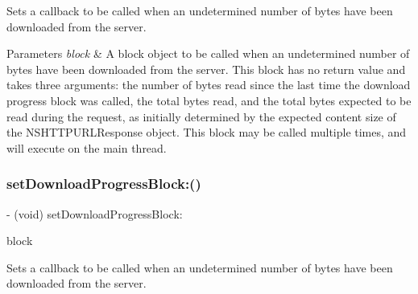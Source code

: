 Sets a callback to be called when an undetermined number of bytes have been downloaded from the server.


\begin{DoxyParams}{Parameters}
{\em block} & A block object to be called when an undetermined number of bytes have been downloaded from the server. This block has no return value and takes three arguments\+: the number of bytes read since the last time the download progress block was called, the total bytes read, and the total bytes expected to be read during the request, as initially determined by the expected content size of the {\ttfamily N\+S\+H\+T\+T\+P\+U\+R\+L\+Response} object. This block may be called multiple times, and will execute on the main thread. \\
\hline
\end{DoxyParams}
\mbox{\label{interface_a_f_u_r_l_connection_operation_a0a6df99ee90311173f0a55248ccf19cb}} 
\subsubsection{\texorpdfstring{set\+Download\+Progress\+Block\+:()}{setDownloadProgressBlock:()}\hspace{0.1cm}{\footnotesize\ttfamily [3/3]}}
{\footnotesize\ttfamily -\/ (void) set\+Download\+Progress\+Block\+: \begin{DoxyParamCaption}\item[{(nullable void($^\wedge$)(N\+S\+U\+Integer bytes\+Read, long long total\+Bytes\+Read, long long total\+Bytes\+Expected\+To\+Read))}]{block }\end{DoxyParamCaption}}

Sets a callback to be called when an undetermined number of bytes have been downloaded from the server.


